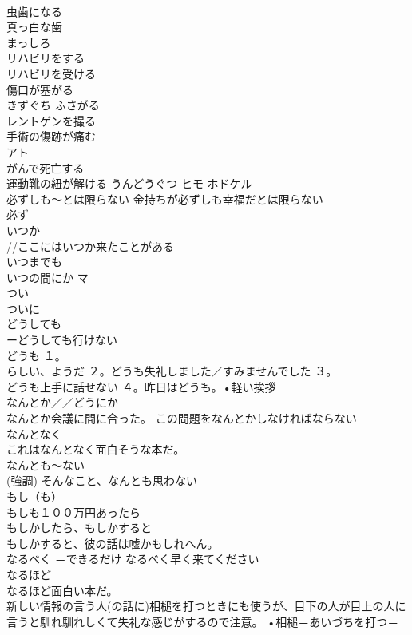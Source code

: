 \documentclass[8pt]{extreport}
\begin{document}
\begin{CJK}{UTF8}{min}
\\	虫歯になる	
\\	真っ白な歯	
\\	まっしろ
\\	リハビリをする	
\\	リハビリを受ける	
\\	傷口が塞がる	
\\	きずぐち ふさがる
\\	レントゲンを撮る	
\\	手術の傷跡が痛む	
\\	アト
\\	がんで死亡する	
\\	運動靴の紐が解ける	うんどうぐつ ヒモ ホドケル 
\\	必ずしも〜とは限らない	金持ちが必ずしも幸福だとは限らない 
\\	必ず	
\\	いつか	
\\	//ここにはいつか来たことがある 
\\	いつまでも	
\\	いつの間にか	マ 
\\	つい	
\\	ついに	
\\	どうしても	
\\	ーどうしても行けない 
\\	どうも	１。
\\	らしい、ようだ ２。どうも失礼しました／すみませんでした ３。
\\	どうも上手に話せない ４。昨日はどうも。•軽い挨拶 
\\	なんとか／／どうにか	
\\	なんとか会議に間に合った。 この問題をなんとかしなければならない
\\	なんとなく	
\\	これはなんとなく面白そうな本だ。
\\	なんとも〜ない	
\\	(強調) そんなこと、なんとも思わない
\\	もし（も）	
\\	もしも１００万円あったら
\\	もしかしたら、もしかすると	
\\	もしかすると、彼の話は嘘かもしれへん。
\\	なるべく	＝できるだけ なるべく早く来てください
\\	なるほど	
\\	なるほど面白い本だ。 
\\	新しい情報の言う人(の話に)相槌を打つときにも使うが、目下の人が目上の人に言うと馴れ馴れしくて失礼な感じがするので注意。 •相槌＝あいづちを打つ＝

\end{CJK}
\end{document}

